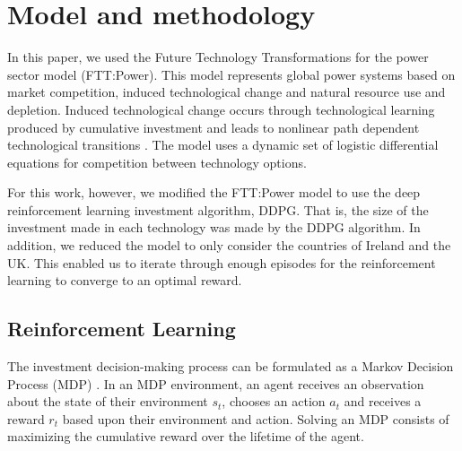 \documentclass{article}
\begin{document}


\section{Model and methodology}
\label{sec:methods}


In this paper, we used the Future Technology Transformations for the power sector model (FTT:Power). This model represents global power systems based on market competition, induced technological change and natural resource use and depletion. Induced technological change occurs through technological learning produced by cumulative investment and leads to nonlinear path dependent technological transitions \cite{Mercure2012}. The model uses a dynamic set of logistic differential equations for competition between technology options.

For this work, however, we modified the FTT:Power model to use the deep reinforcement learning investment algorithm, DDPG. That is, the size of the investment made in each technology was made by the DDPG algorithm. In addition, we reduced the model to only consider the countries of Ireland and the UK. This enabled us to iterate through enough episodes for the reinforcement learning to converge to an optimal reward.

\subsection*{Reinforcement Learning}

The investment decision-making process can be formulated as a Markov Decision Process (MDP) \cite{puterman2014markov}. In an MDP environment, an agent receives an observation about the state of their environment $s_t$, chooses an action $a_t$ and receives a reward $r_t$ based upon their environment and action. Solving an MDP consists of maximizing the cumulative reward over the lifetime of the agent. 
\end{document}
